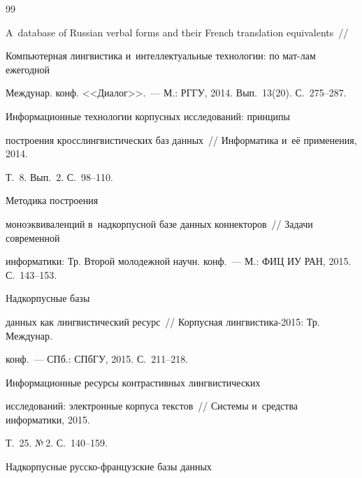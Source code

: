 {{\begin{thebibliography}{99}


 A~database of Russian verbal forms and their French translation equivalents~/\!\!/ 


Компьютерная лингвистика и~интеллектуальные технологии: по мат-лам ежегодной 


Междунар. конф. <<Диалог>>.~--- М.: РГГУ, 2014. Вып.~13(20). С.~275--287.




 Информационные технологии корпусных исследований: принципы 


построения кросслингвистических баз данных~/\!\!/ Информатика и~её применения, 2014. 


Т.~8. Вып.~2. С.~98--110.







 Методика построения 


моноэквиваленций в~надкорпусной базе данных коннекторов~/\!\!/ Задачи современной 


информатики: Тр. Второй молодежной научн. конф.~--- М.: ФИЦ ИУ РАН, 2015. С.~143--153.




 Надкорпусные базы 


данных как лингвистический ресурс~/\!\!/ Корпусная лингвистика-2015: Тр. Междунар. 


конф.~--- СПб.: СПбГУ, 2015. С.~211--218.




 Информационные ресурсы контрастивных лингвистических 


исследований: электронные корпуса текстов~/\!\!/ Системы и~средства информатики, 2015. 


Т.~25. №\,2. С.~140--159.







 Надкорпусные рус\-ско-фран\-цуз\-ские базы данных 



\end{thebibliography}}}
